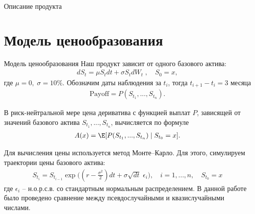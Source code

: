 \documentclass[aspectratio=169]{beamer}
\begin{document}
 \begin{frame}{Описание продукта}
  \begin{center}
\end{center}
   \end{frame}



    \section{Модель ценообразования}
    \begin{frame}{Модель ценообразования}
    Наш продукт зависит от одного базового актива:
    \begin{align*}
        dS_t = \mu S_t dt + \sigma S_t dW_t\;, \quad S_0 = x,
    \end{align*}
    где $\mu=0,\;\sigma=10\%$.
    Обозначим даты наблюдения за $t_i$, тогда $t_{i+1}-t_i = \text{3 месяца}$ 
    \begin{align*}
        \text{Payoff}= P(S_{t_1}, ..., S_{t_n}).
    \end{align*}

    В риск-нейтральной мере цена дериватива с функцией выплат $P$, зависящей от значений базового актива $S_{t_1}, ..., S_{t_n}$, вычисляется по формуле
    \begin{align*}\label{AutocallValue}
        A(x) = \E[P(S_{t_1}, ..., S_{t_n})\; |\; S_{t_0} = x].
    \end{align*}
    \end{frame}

    \begin{frame}
    Для вычисления цены используется метод Монте--Карло. Для этого, симулируем траектории цены базового актива:
    \begin{align*}
        S_{t_i} = S_{t_{i-1}} \exp\Big((r-\frac{\sigma^2}{2})dt + \sigma \sqrt{dt} \;\epsilon_i\Big), \quad i=1,..., n, \quad S_{t_0} = x
    \end{align*}
    где $\epsilon_i$ -- н.о.р.с.в. со стандартным нормальным распределением. В данной работе было проведено сравнение между псевдослучайными и квазислучайными числами.
    \end{frame}
\end{document}
